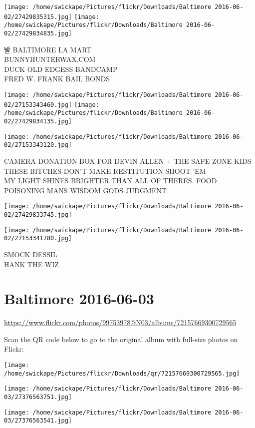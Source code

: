 \documentclass[10pt,letterpaper]{article}
\begin{document}
\texttt{[image: /home/swickape/Pictures/flickr/Downloads/Baltimore 2016-06-02/27429835315.jpg]}
\texttt{[image: /home/swickape/Pictures/flickr/Downloads/Baltimore 2016-06-02/27429834835.jpg]}

발 BALTIMORE LA MART\\
BUNNYHUNTERWAX.COM\\
DUCK OLD EDGESS BANDCAMP\\
FRED W. FRANK BAIL BONDS
\pagebreak

\texttt{[image: /home/swickape/Pictures/flickr/Downloads/Baltimore 2016-06-02/27153343460.jpg]}
\texttt{[image: /home/swickape/Pictures/flickr/Downloads/Baltimore 2016-06-02/27429834135.jpg]}

\texttt{[image: /home/swickape/Pictures/flickr/Downloads/Baltimore 2016-06-02/27153343120.jpg]}

CAMERA DONATION BOX FOR DEVIN ALLEN + THE SAFE ZONE KIDS\\
THESE BITCHES DON'T MAKE RESTITUTION SHOOT 'EM\\
MY LIGHT SHINES BRIGHTER THAN ALL OF THERES.  FOOD POISONING MANS WISDOM GODS JUDGMENT
\pagebreak

\texttt{[image: /home/swickape/Pictures/flickr/Downloads/Baltimore 2016-06-02/27429833745.jpg]}

\vspace{0.25in}
\texttt{[image: /home/swickape/Pictures/flickr/Downloads/Baltimore 2016-06-02/27153341780.jpg]}

SMOCK DESSIL\\
HANK THE WIZ
\pagebreak

\section*{Baltimore 2016-06-03}

\url{https://www.flickr.com/photos/99753978@N03/albums/72157669300729565}

Scan the QR code below to go to the original album with full-size photos on Flickr:

\texttt{[image: /home/swickape/Pictures/flickr/Downloads/qr/72157669300729565.jpg]}
\pagebreak

\texttt{[image: /home/swickape/Pictures/flickr/Downloads/Baltimore 2016-06-03/27376563751.jpg]}

\vspace{0.25in}
\texttt{[image: /home/swickape/Pictures/flickr/Downloads/Baltimore 2016-06-03/27376563541.jpg]}
\end{document}
